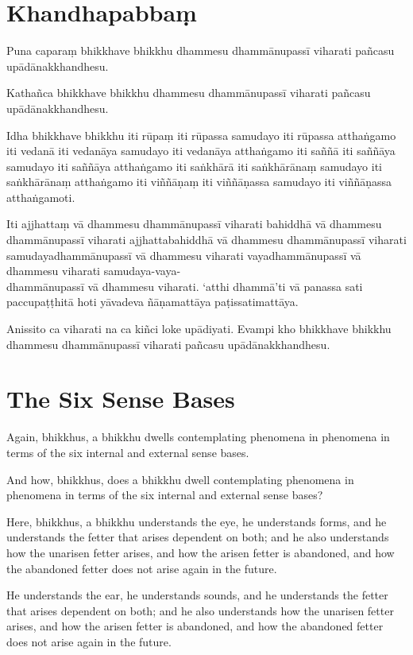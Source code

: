 
\paliPage
\section*{Khandhapabbaṃ}

Puna caparaṃ bhikkhave bhikkhu dhammesu dhammānupassī viharati pañcasu
upādānakkhandhesu.

Kathañca bhikkhave bhikkhu dhammesu dhammānupassī viharati pañcasu
upādānakkhandhesu.

Idha bhikkhave bhikkhu
iti rūpaṃ iti rūpassa samudayo iti rūpassa atthaṅgamo
iti vedanā iti vedanāya samudayo iti vedanāya atthaṅgamo
iti saññā iti saññāya samudayo iti saññāya atthaṅgamo
iti saṅkhārā iti saṅkhārānaṃ samudayo iti saṅkhārānaṃ atthaṅgamo
iti viññāṇaṃ iti viññāṇassa samudayo iti viññāṇassa atthaṅgamoti.

Iti ajjhattaṃ vā dhammesu dhammānupassī viharati bahiddhā vā dhammesu
dhammānupassī viharati ajjhattabahiddhā vā dhammesu dhammānupassī viharati
samudayadhammānupassī vā dhammesu viharati vayadhammānupassī vā dhammesu
viharati samudaya-vaya-\\
dhammānupassī vā dhammesu viharati. `atthi dhammā'ti vā
panassa sati paccupaṭṭhitā hoti yāvadeva ñāṇamattāya paṭissatimattāya.

Anissito ca viharati na ca kiñci loke upādiyati. Evampi kho bhikkhave bhikkhu
dhammesu dhammānupassī viharati pañcasu upādānakkhandhesu.


\englishPage
\section{The Six Sense Bases}

Again, bhikkhus, a bhikkhu dwells contemplating phenomena in phenomena in terms
of the six internal and external sense bases.

And how, bhikkhus, does a bhikkhu dwell contemplating phenomena in phenomena in
terms of the six internal and external sense bases?

Here, bhikkhus, a bhikkhu understands the eye, he understands forms, and he
understands the fetter that arises dependent on both; and he also understands
how the unarisen fetter arises, and how the arisen fetter is abandoned, and how
the abandoned fetter does not arise again in the future.

He understands the ear, he understands sounds, and he understands the fetter
that arises dependent on both; and he also understands how the unarisen fetter
arises, and how the arisen fetter is abandoned, and how the abandoned fetter
does not arise again in the future.

